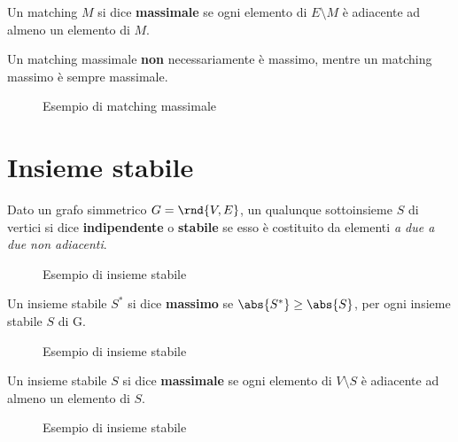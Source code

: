 \documentclass[\main/main.tex]{subfiles}
\begin{document}
\clearpage
\begin{definition}
	Un matching \(M\) si dice \textbf{massimale} se ogni elemento di \(E\setminus M\) è adiacente ad almeno un elemento di \(M\).

	Un matching massimale \textbf{non} necessariamente è massimo, mentre un matching massimo è sempre massimale.
	\begin{figure}
		\MaximalMatching{}
		\caption{Esempio di matching massimale}
	\end{figure}
\end{definition}
\clearpage
\section{Insieme stabile}
\begin{definition}
	Dato un grafo simmetrico \(G=\rnd{V, E}\), un qualunque sottoinsieme \(S\) di vertici si dice \textbf{indipendente} o \textbf{stabile} se esso è costituito da elementi \textit{a due a due non adiacenti}.
	\begin{figure}
		\InsiemeStabile{}
		\caption{Esempio di insieme stabile}
	\end{figure}
\end{definition}
\begin{definition}
	Un insieme stabile \(S^*\) si dice \textbf{massimo} se \(\abs{S^*} \geq \abs{S}\), per ogni insieme stabile \(S\) di G.

	\begin{figure}
		\InsiemeStabile{}
		\caption{Esempio di insieme stabile}
	\end{figure}
\end{definition}
\begin{definition}
	Un insieme stabile \(S\) si dice \textbf{massimale} se ogni elemento di \(V\setminus S\) è adiacente ad almeno un elemento di \(S\).

	\begin{figure}
		\InsiemeStabile{}
		\caption{Esempio di insieme stabile}
	\end{figure}
\end{definition}
\clearpage
\end{document}
